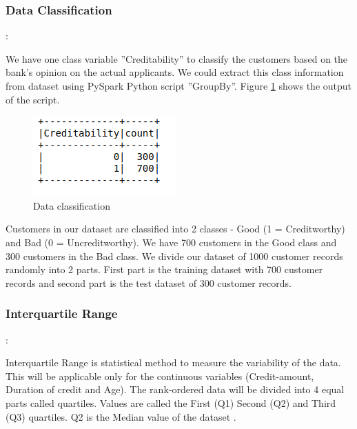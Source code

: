 \documentclass[sigconf]{acmart}
\begin{document}
\subsubsection{Data Classification}\label{Data Classification}:

We have one class variable ''Creditability'' to classify the customers based on the bank's opinion on the actual applicants. We could extract this class information from dataset using PySpark Python script ''GroupBy''. Figure \ref{fig:Figure16} shows the output of the script.

\begin{figure}[htb]
  \centering
  \includegraphics[width=1.0\columnwidth]{images/Figure16.png}
  \caption{Data classification}
  \label{fig:Figure16} 
\end{figure}

Customers in our dataset are classified into 2 classes - Good (1 = Creditworthy) and Bad (0 = Uncreditworthy). We have 700 customers in the Good class and 300 customers in the Bad class. We divide our dataset of 1000 customer records randomly into 2 parts. First part is the training dataset with 700 customer records and second part is the test dataset of 300 customer records.


\subsubsection{Interquartile Range}:

Interquartile Range is statistical method to measure the variability of the data. This will be applicable only for the continuous variables (Credit-amount, Duration of credit and Age). The rank-ordered data will be divided into 4 equal parts called quartiles. Values are called the First (Q1) Second (Q2) and Third (Q3) quartiles. Q2 is the Median value of the dataset \cite{stat-trek-statistics}.
\end{document}
